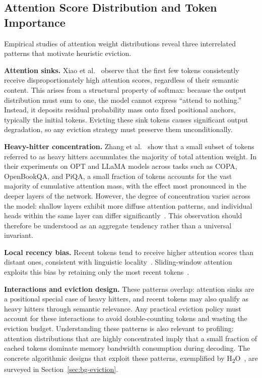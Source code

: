 \documentclass[
english,                 %
bibtex,                  %
]{kththesis}
\numberwithin{listing}{chapter}
\begin{document}
\subsection{Attention Score Distribution and Token Importance}
\label{sec:bg-attention-distribution}

Empirical studies of attention weight distributions reveal three interrelated patterns that motivate heuristic eviction.

\textbf{Attention sinks.} Xiao et al.~\cite{xiao2024efficient} observe that the first few tokens consistently receive disproportionately high attention scores, regardless of their semantic content. This arises from a structural property of softmax: because the output distribution must sum to one, the model cannot express ``attend to nothing.'' Instead, it deposits residual probability mass onto fixed positional anchors, typically the initial tokens. Evicting these sink tokens causes significant output degradation, so any eviction strategy must preserve them unconditionally.

\textbf{Heavy-hitter concentration.} Zhang et al.~\cite{zhang2024h2o} show that a small subset of tokens referred to as heavy hitters accumulates the majority of total attention weight. In their experiments on OPT and LLaMA models across tasks such as COPA, OpenBookQA, and PiQA, a small fraction of tokens accounts for the vast majority of cumulative attention mass, with the effect most pronounced in the deeper layers of the network. However, the degree of concentration varies across the model: shallow layers exhibit more diffuse attention patterns, and individual heads within the same layer can differ significantly~\cite{ge2024model}. This observation should therefore be understood as an aggregate tendency rather than a universal invariant.

\textbf{Local recency bias.} Recent tokens tend to receive higher attention scores than distant ones, consistent with linguistic locality~\cite{liu2024scissorhands}. Sliding-window attention exploits this bias by retaining only the most recent tokens~\cite{xiao2024efficient}.

\textbf{Interactions and eviction design.} These patterns overlap: attention sinks are a positional special case of heavy hitters, and recent tokens may also qualify as heavy hitters through semantic relevance. Any practical eviction policy must account for these interactions to avoid double-counting tokens and wasting the eviction budget. Understanding these patterns is also relevant to profiling: attention distributions that are highly concentrated imply that a small fraction of cached tokens dominate memory bandwidth consumption during decoding. The concrete algorithmic designs that exploit these patterns, exemplified by H\textsubscript{2}O~\cite{zhang2024h2o}, are surveyed in Section~\ref{sec:bg-eviction}.
\end{document}
